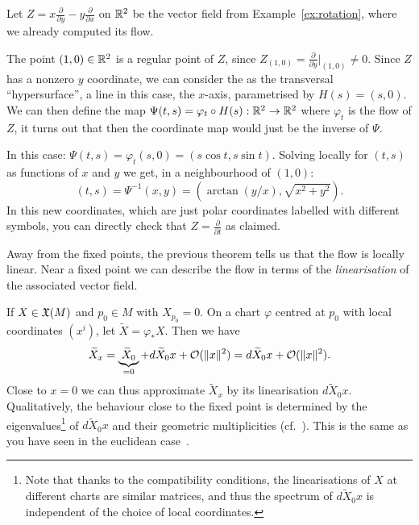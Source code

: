 \begin{example}\label{ex:hyplin}
  Let $Z = x\frac{\partial}{\partial y} - y\frac{\partial}{\partial x}$ on $\mathbb{R}^2$ be the vector field from Example~\ref{ex:rotation}, where we already computed its flow.

  The point $(1,0)\in\mathbb{R}^2$ is a regular point of $Z$, since $Z_{(1,0)} = \frac{\partial}{\partial y}\Big|_{(1,0)} \neq 0$.
  Since $Z$ has a nonzero $y$ coordinate, we can consider the as the transversal ``hypersurface'', a line in this case, the $x$-axis, parametrised by $H(s) = (s,0)$.
  We can then define the map $\Psi(t,s) = \varphi_t\circ H(s) : \mathbb{R}^2\to\mathbb{R}^2$ where $\varphi_t$ is the flow of $Z$, it turns out that then the coordinate map would just be the inverse of $\Psi$.

  In this case: $\Psi(t,s) = \varphi_t(s,0) = (s\cos t, s\sin t)$.
  Solving locally for $(t,s)$ as functions of $x$ and $y$ we get, in a neighbourhood of $(1,0)$:
  \begin{equation}
    (t,s) = \Psi^{-1}(x,y) = \left(\arctan(y/x), \sqrt{x^2+y^2}\right).
  \end{equation}
  In this new coordinates, which are just polar coordinates labelled with different symbols, you can directly check that $Z = \frac{\partial}{\partial t}$ as claimed.
\end{example}

\begin{remark}
  Away from the fixed points, the previous theorem tells us that the flow is locally linear.
  Near a fixed point we can describe the flow in terms of the \emph{linearisation} of the associated vector field.

  If $X\in\mathfrak{X}(M)$ and $p_0\in M$ with $X_{p_0} = 0$. On a chart $\varphi$ centred at $p_0$ with local coordinates $(x^i)$, let $\widetilde X = \varphi_* X$.
  Then we have
  \begin{equation}
    \widetilde X_x = \underbrace{\widetilde X_0}_{=0} + d\widetilde X_0 x + \mathcal{O}(\|x\|^2) = d\widetilde X_0 x + \mathcal{O}(\|x\|^2).
  \end{equation}
  Close to $x=0$ we can thus approximate $\widetilde X_x$ by its linearisation $ d\widetilde X_0 x$.
  Qualitatively, the behaviour close to the fixed point is determined by the eigenvalues\footnote{Note that thanks to the compatibility conditions, the linearisations of $X$ at different charts are similar matrices, and thus the spectrum of $d\widetilde X_0 x$ is independent of the choice of local coordinates.} of $d\widetilde X_0 x$ and their geometric multiplicities (cf.~\cite[Figure 9.8]{book:lee}). This is the same as you have seen in the euclidean case~\cite[Chapter 5.3]{book:knauf}.
\end{remark}


